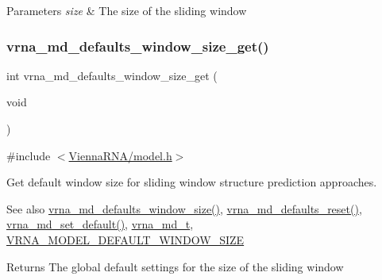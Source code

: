 \begin{DoxyParams}{Parameters}
{\em size} & The size of the sliding window \\
\hline
\end{DoxyParams}
\mbox{\label{group__model__details_ga670146a9aa3ba77f4d422d60b7c30ac9}} 
\subsubsection{\texorpdfstring{vrna\_md\_defaults\_window\_size\_get()}{vrna\_md\_defaults\_window\_size\_get()}}
{\footnotesize\ttfamily int vrna\+\_\+md\+\_\+defaults\+\_\+window\+\_\+size\+\_\+get (\begin{DoxyParamCaption}\item[{void}]{ }\end{DoxyParamCaption})}



{\ttfamily \#include $<$\mbox{\hyperlink{model_8h}{Vienna\+R\+N\+A/model.\+h}}$>$}



Get default window size for sliding window structure prediction approaches. 

\begin{DoxySeeAlso}{See also}
\mbox{\hyperlink{group__model__details_ga7b802ce0e8c3181bf5cb580de6d5b26a}{vrna\+\_\+md\+\_\+defaults\+\_\+window\+\_\+size()}}, \mbox{\hyperlink{group__model__details_ga70834424cf804d149937de89f80ceb45}{vrna\+\_\+md\+\_\+defaults\+\_\+reset()}}, \mbox{\hyperlink{group__model__details_ga8ac6ff84936282436f822644bf841f66}{vrna\+\_\+md\+\_\+set\+\_\+default()}}, \mbox{\hyperlink{group__model__details_ga1f8a10e12a0a1915f2a4eff0b28ea17c}{vrna\+\_\+md\+\_\+t}}, \mbox{\hyperlink{group__model__details_ga8de04a9cb57e811e313b0f9f207f6bdb}{V\+R\+N\+A\+\_\+\+M\+O\+D\+E\+L\+\_\+\+D\+E\+F\+A\+U\+L\+T\+\_\+\+W\+I\+N\+D\+O\+W\+\_\+\+S\+I\+ZE}} 
\end{DoxySeeAlso}
\begin{DoxyReturn}{Returns}
The global default settings for the size of the sliding window 
\end{DoxyReturn}
\mbox{\label{group__model__details_ga41521d5b9fb7e0f31e7ea73f5792afab}} 
